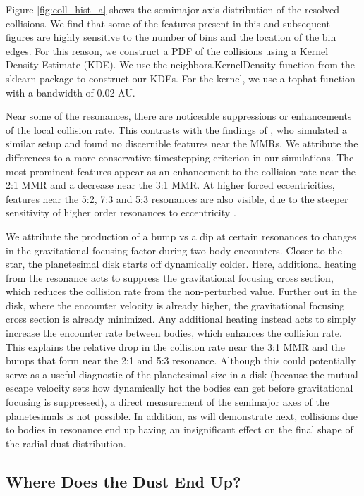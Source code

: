 \documentclass[onecolumn]{aastex63}
\begin{document}
Figure \ref{fig:coll_hist_a} shows the semimajor axis distribution of the resolved collisions. We find that some of the features present in this and subsequent figures are highly sensitive to the number of bins and the location of the bin edges. For this reason, we construct a PDF of the collisions using a Kernel Density Estimate (KDE). We use the {\sc neighbors.KernelDensity} function from the {\sc sklearn} \citep{scikit-learn} package to construct our KDEs. For the kernel, we use a tophat function with a bandwidth of 0.02 AU.

Near some of the resonances, there are noticeable suppressions or enhancements of the local collision rate. This contrasts with the findings of \citet{2000Icar..143...45R}, who simulated a similar setup and found no discernible features near the MMRs. We attribute the differences to  a more conservative timestepping criterion in our simulations. The most prominent features appear as an enhancement to the collision rate near the 2:1 MMR and a decrease near the 3:1 MMR. At higher forced eccentricities, features near the 5:2, 7:3 and 5:3 resonances are also visible, due to the steeper sensitivity of higher order resonances to eccentricity \citep{1994PhyD...77..289M}.

We attribute the production of a bump vs a dip at certain resonances to changes in the gravitational focusing factor during two-body encounters. Closer to the star, the planetesimal disk starts off dynamically colder. Here, additional heating from the resonance acts to suppress the gravitational focusing cross section, which reduces the collision rate from the non-perturbed value. Further out in the disk, where the encounter velocity is already higher, the gravitational focusing cross section is already minimized. Any additional heating instead acts to simply increase the encounter rate between bodies, which enhances the collision rate. This explains the relative drop in the collision rate near the 3:1 MMR and the bumps that form near the 2:1 and 5:3 resonance. Although this could potentially serve as a useful diagnostic of the planetesimal size in a disk (because the mutual escape velocity sets how dynamically hot the bodies can get before gravitational focusing is suppressed), a direct measurement of the semimajor axes of the planetesimals is not possible. In addition, as will demonstrate next, collisions due to bodies in resonance end up having an insignificant effect on the final shape of the radial dust distribution.

\subsection{Where Does the Dust End Up?}
\end{document}
